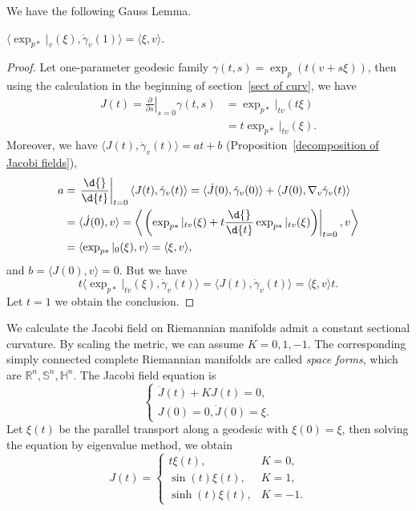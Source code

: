 We have the following Gauss Lemma.
\begin{prop}\label{gauss lemma}
    $\langle\exp_{p*}|_v(\xi),\dot{\gamma}_v(1)\rangle=\langle\xi,v\rangle$.
\end{prop}
\begin{proof}
    Let one-parameter geodesic family $\gamma(t,s)=\exp_p(t(v+s\xi))$, then using the calculation in the beginning of section~\ref{sect of curv}, we have
    \begin{align*}
        J(t)=\left.\frac{\partial{}}{\partial{s}}\right|_{s=0}\gamma(t,s)&=\exp_{p*}|_{tv}(t\xi)\\
        &=t\exp_{p*}|_{tv}(\xi).
    \end{align*}
    Moreover, we have $\langle J(t),\dot{\gamma}_v(t)\rangle=at+b$ (Proposition~\ref{decomposition of Jacobi fields}),
    \begin{align*}
        a&=\left.\frac{\d{}}{\d{t}}\right|_{t=0}\langle J(t),\dot{\gamma}_v(t)\rangle=\langle\dot{J}(0),\dot{\gamma}_v(0)\rangle+\langle J(0),\nabla_v\dot{\gamma}_v(t)\rangle\\
        &=\langle\dot{J}(0),v\rangle=\left\langle\left.\left(\exp_{p*}|_{tv}(\xi)+t\frac{\d{}}{\d{t}}\exp_{p*}|_{tv}(\xi)\right)\right|_{t=0},v\right\rangle\\
        &=\langle\exp_{p*}|_0(\xi),v\rangle=\langle\xi,v\rangle,
    \end{align*}
    and $b=\langle J(0),v\rangle=0$.
    But we have
    \[t\langle\exp_{p*}|_{tv}(\xi),\dot{\gamma}_v(t)\rangle=\langle J(t),\dot{\gamma}_v(t)\rangle=\langle\xi,v\rangle t.\]
    Let $t=1$ we obtain the conclusion.
\end{proof}

\begin{eg}
    We calculate the Jacobi field on Riemannian manifolds admit a constant sectional curvature.
    By scaling the metric, we can assume $K=0,1,-1$.
    The corresponding simply connected complete Riemannian manifolds are called \emph{space forms}, which are $\mathbb{R}^n,\mathbb{S}^n,\mathbb{H}^n$.
    The Jacobi field equation is
    \[\begin{cases}
        \ddot{J}(t)+KJ(t)=0,\\
        J(0)=0,\dot{J}(0)=\xi.
    \end{cases}\]
    Let $\xi(t)$ be the parallel transport along a geodesic with $\xi(0)=\xi$, then solving the equation by eigenvalue method, we obtain
    \[J(t)=\begin{cases}
        t\xi(t), & K=0,\\
        \sin(t)\xi(t), & K=1,\\
        \sinh(t)\xi(t), & K=-1.
    \end{cases}\]
\end{eg}


